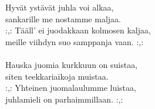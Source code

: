 
            Hyvät ystävät juhla voi alkaa, \\
            sankarille me nostamme maljaa. \\
            :,: Tääll' ei juodakkaan kolmosen kaljaa, \\
            meille viihdyn suo samppanja vaan. :,: \\
\hspace{10mm} \\
            Hauska juomia kurkkuun on suistaa, \\
            siten teekkariaikoja muistaa. \\
            :,: Yhteinen juomalaulumme luistaa, \\
            juhlamieli on parhaimmillaan. :,: \\
